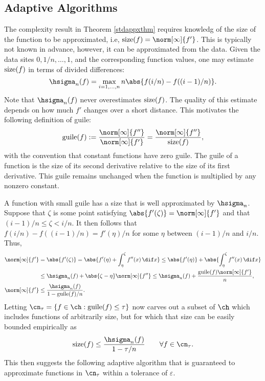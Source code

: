 \subsection{Adaptive Algorithms}

The complexity result in Theorem \ref{stdappxthm} requires knowledg of the size of the function to be approximated, i.e, $\size(f) = \norm[\infty]{f'}$.  This is typically not known in advance, however, it can be approximated from the data. Given the data sites $0, 1/n, \dots, 1$, and the corresponding function values, one may estimate $\operatorname{size}(f)$ in terms of divided differences:
\begin{equation}
\hsigma_n(f)= \max_{i=1, \ldots, n} n\abs{f(i/n)-f((i-1)/n)}.
\end{equation}
Note that $\hsigma_n(f)$ never overestimates $\operatorname{size}(f)$.  The quality of this estimate depends on how much $f'$ changes over a short distance.  This motivates the following definition of guile:
\begin{equation}
\guile(f):= \frac{\norm[\infty]{f''}}{\norm[\infty]{f'}} = \frac{\norm[\infty]{f''}}{\size(f)},
\end{equation}
with the convention that constant functions have zero guile.  The guile of a function is the size of its second derivative relative to the size of its first derivative.  This guile remains unchanged when the function is multiplied by any nonzero constant.

A function with small guile has a size that is well approximated by $\hsigma_n$.  Suppose that $\zeta$ is some point satisfying $\abs{f'(\zeta)} = \norm[\infty]{f'}$ and that $(i-1)/n \le \zeta < i/n$.  It then follows that $f(i/n)-f((i-1)/n) = f'(\eta)/n$ for some $\eta$ between $(i-1)/n$ and $i/n$.  Thus,
\begin{align*}
\norm[\infty]{f'} &= \abs{f'(\zeta)} = \abs{f'(\eta) + \int_{\eta}^{\zeta} f''(x) \, \dif x} \le \abs{f'(\eta)} + \abs{\int_{\eta}^{\zeta} f''(x) \, \dif x} \\
& \le \hsigma_n(f) + \abs{\zeta - \eta} \norm[\infty]{f''} \le \hsigma_n(f) + \frac{\guile(f) \norm[\infty]{f'}}{n}, \\
\norm[\infty]{f'} & \le \frac{\hsigma_n(f)}{1 - \guile(f)/n}.
\end{align*}
Letting $\cn_{\tau} = \{ f \in \ch : \guile(f) \le \tau\}$ now carves out a subset of $\ch$ which includes functions of arbitrarily size, but for which that size can be easily bounded empirically as
\begin{equation} \label{sizebd}
\size(f) \le \frac{\hsigma_n(f)}{1 - \tau/n} \qquad \forall f \in \cn_{\tau}.
\end{equation}
This then suggests the following adaptive algorithm that is guaranteed to approximate functions in $\cn_{\tau}$ within a tolerance of $\varepsilon$.


